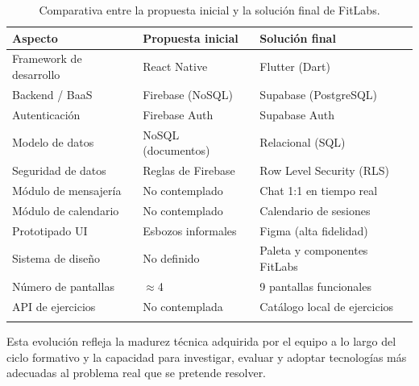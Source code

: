 \begin{longtable}{@{}p{5cm}p{4.5cm}p{4.5cm}@{}}
\toprule
\textbf{Aspecto} & \textbf{Propuesta inicial} & \textbf{Solución final} \\
\midrule
\endhead
Framework de desarrollo & React Native & Flutter (Dart) \\
Backend / BaaS & Firebase (NoSQL) & Supabase (PostgreSQL) \\
Autenticación & Firebase Auth & Supabase Auth \\
Modelo de datos & NoSQL (documentos) & Relacional (SQL) \\
Seguridad de datos & Reglas de Firebase & Row Level Security (RLS) \\
Módulo de mensajería & No contemplado & Chat 1:1 en tiempo real \\
Módulo de calendario & No contemplado & Calendario de sesiones \\
Prototipado UI & Esbozos informales & Figma (alta fidelidad) \\
Sistema de diseño & No definido & Paleta y componentes FitLabs \\
Número de pantallas & $\approx$4 & 9 pantallas funcionales \\
API de ejercicios & No contemplada & Catálogo local de ejercicios \\
\bottomrule
\caption{Comparativa entre la propuesta inicial y la solución final de FitLabs.}
\label{tab:evolucion_tecnologica}
\end{longtable}

Esta evolución refleja la madurez técnica adquirida por el equipo a lo largo del ciclo formativo y la capacidad para investigar, evaluar y adoptar tecnologías más adecuadas al problema real que se pretende resolver.
